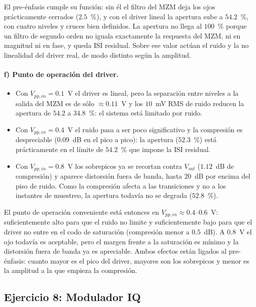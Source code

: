 El pre-énfasis cumple su función: sin él el filtro del MZM deja los ojos
prácticamente cerrados ($2.5$~\%), y con el driver lineal la apertura sube
a $54.2$~\%, con cuatro niveles y cruces bien definidos. La apertura no
llega al $100$~\% porque un filtro de segundo orden no iguala exactamente
la respuesta del MZM, ni en magnitud ni en fase, y queda ISI residual.
Sobre ese valor actúan el ruido y la no linealidad del driver real, de
modo distinto según la amplitud.

\paragraph{f) Punto de operación del driver.}
%
\begin{itemize}\itemsep2pt
\item Con $V_{pp,in} = 0.1$~V el driver es lineal, pero la separación
      entre niveles a la salida del MZM es de sólo $\approx 0.11$~V y los
      $10$~mV RMS de ruido reducen la apertura de $54.2$ a $34.8$~\%: el
      sistema está limitado por ruido.
\item Con $V_{pp,in} = 0.4$~V el ruido pasa a ser poco significativo y la
      compresión es despreciable ($0.09$~dB en el pico a pico): la
      apertura ($52.3$~\%) está prácticamente en el límite de $54.2$~\%
      que impone la ISI residual.
\item Con $V_{pp,in} = 0.8$~V los sobrepicos ya se recortan contra
      $V_{sat}$ ($1.12$~dB de compresión) y aparece distorsión fuera de
      banda, hasta $20$~dB por encima del piso de ruido. Como la
      compresión afecta a las transiciones y no a los instantes de
      muestreo, la apertura todavía no se degrada ($52.8$~\%).
\end{itemize}
%
El punto de operación conveniente está entonces en
$V_{pp,in} \approx 0.4$--$0.6$~V: suficientemente alto para que el ruido
no limite y suficientemente bajo para que el driver no entre en el codo de
saturación (compresión menor a $0.5$~dB). A $0.8$~V el ojo todavía es
aceptable, pero el margen frente a la saturación es mínimo y la
distorsión fuera de banda ya es apreciable. Ambos efectos están ligados
al pre-énfasis: cuanto mayor es el pico del driver, mayores son los
sobrepicos y menor es la amplitud a la que empieza la compresión.

\subsection*{Ejercicio 8: Modulador IQ}

